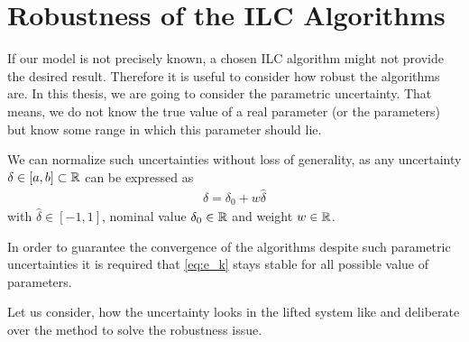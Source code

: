 \chapter{Robustness of the ILC Algorithms}
\label{ch:Robustness}
If our model is not precisely known, a chosen ILC algorithm might not provide the desired result. 
Therefore it is useful to consider how robust the algorithms are. 
In this thesis, we are going to consider the parametric uncertainty. That means, we do not know the true value of a real parameter (or the parameters) but know some range in which this parameter should lie. 

We can normalize such uncertainties without loss of generality, as any uncertainty $\delta \in [a,b] \subset {\mathbb{R}}$ can be expressed as 
\begin{align}
\label{eq:rob:del=del0+...}
\delta = \delta_0 + w \hat{\delta}
\end{align}
with $\hat{\delta} \in [-1,1]$, nominal value $\delta_0 \in {\mathbb{R}}$ and weight $w\in {\mathbb{R}}$. 

%

In order to guarantee the convergence of the algorithms despite such parametric uncertainties it is required that \eqref{eq:e_k}  stays stable for all possible value of parameters.

Let us consider, how the uncertainty looks in the lifted system like and deliberate over the method to solve the robustness issue. 





